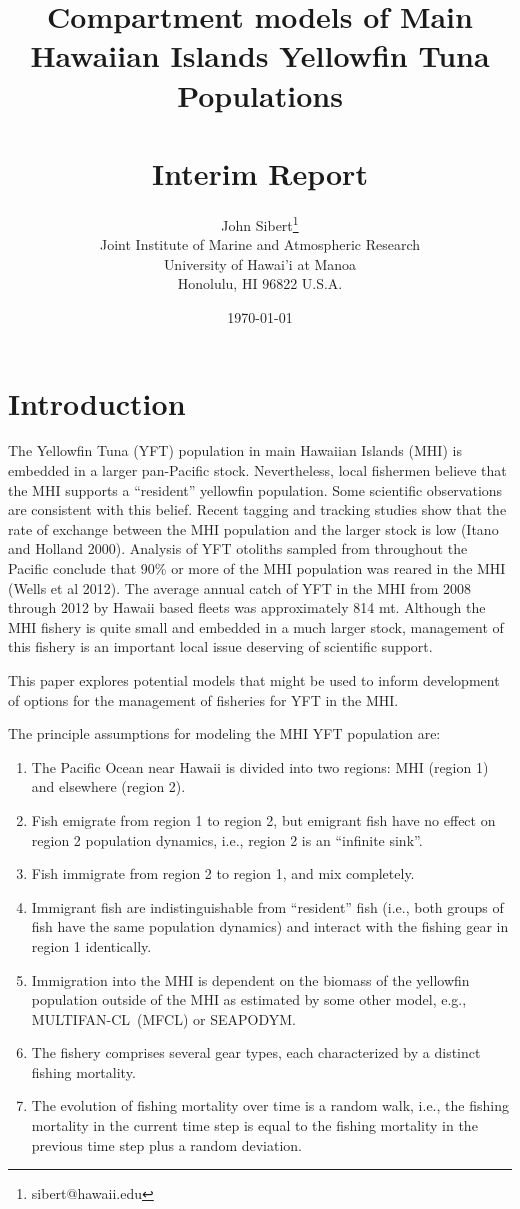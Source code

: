 \documentclass[12pt,letterpaper]{article}
\title{Compartment models of Main Hawaiian Islands Yellowfin Tuna
Populations\\
~\\
Interim Report}
\author{
John Sibert\thanks{sibert@hawaii.edu}\\
Joint Institute of Marine and Atmospheric Research\\
University of Hawai'i at Manoa\\
Honolulu, HI  96822 U.S.A.\\[0.125in]
\date{\today}
}
\newcommand\doublespacing{\baselineskip=1.6\normalbaselineskip}
\newcommand\SD{SEAPODYM}
\newcommand\MFCL{MULTIFAN-CL}
\begin{document}
\maketitle

\doublespacing

\section*{Introduction}
The Yellowfin Tuna (YFT) population in main Hawaiian Islands (MHI) is
embedded in a larger pan-Pacific stock. Nevertheless, local fishermen
believe that the MHI supports a ``resident'' yellowfin population.
Some scientific observations are consistent with this belief. 
Recent tagging and tracking
studies show that the rate of exchange between the MHI population
and the larger stock is low (Itano and Holland 2000). Analysis
of YFT otoliths sampled from
throughout the Pacific conclude that 90\% or more of the MHI
population was reared in the MHI (Wells et al 2012).
The average annual catch of YFT in the MHI from 2008 through 2012 by Hawaii
based fleets was approximately 814 mt. 
Although the MHI fishery is quite small and embedded in a much larger
stock, management of this
fishery is an important local issue deserving of scientific support.

This paper explores potential models that might be used to
inform development of options for the management of fisheries for YFT
in the MHI.

The principle assumptions for modeling the MHI YFT population are:
\begin{enumerate}
\item The Pacific Ocean near Hawaii is divided into two regions:
MHI (region 1) and elsewhere (region 2).%
\item Fish emigrate from region 1 to region 2, but emigrant fish have
no effect on region 2 population dynamics, i.e., region 2 is an ``infinite
sink''.
\item Fish immigrate from region 2 to region 1, and mix completely.
\item Immigrant fish are indistinguishable from ``resident'' fish
(i.e., both groups of fish have the same population dynamics) and
interact with the fishing gear in region 1 identically.
\item Immigration into the MHI is dependent on the
biomass of the yellowfin population outside of the MHI as estimated by
some other model, e.g., \MFCL\ (MFCL) or \SD.
\item The fishery comprises several gear types, each characterized by 
a distinct fishing mortality.
\item The evolution of fishing mortality over time is a random walk,
i.e., the fishing mortality in the current time step is equal
to the fishing mortality in the previous time step plus a random
deviation.
\end{enumerate}
\end{document}
